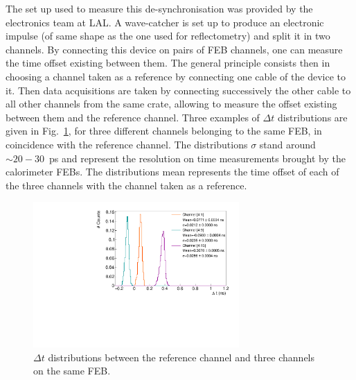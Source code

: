 The set up used to measure this de-synchronisation was provided by the electronics team at LAL.
A wave-catcher is set up to produce an electronic impulse (of same shape as the one used for reflectometry) and split it in two channels.
By connecting this device on pairs of FEB channels, one can measure the time offset existing between them.
The general principle consists then in choosing a channel taken as a reference by connecting one cable of the device to it.
Then data acquisitions are taken by connecting successively the other cable to all other channels from the same crate, allowing to measure the offset existing between them and the reference channel.
Three examples of $\Delta t$ distributions are given in Fig.~\ref{fig:FEB_offset}, for three different channels belonging to the same FEB, in coincidence with the reference channel.
The distributions $\sigma$ stand around $\sim20-30$~ps and represent the resolution on time measurements brought by the calorimeter FEBs.
The distributions mean represents the time offset of each of the three channels with the channel taken as a reference.
\begin{figure}[h!]
  \centering
  \includegraphics[width=0.7\textwidth]{commissioning/fig_commissioning/time_offset.pdf}
  \caption{$\Delta t$ distributions between the reference channel and three channels on the same FEB.
    \label{fig:FEB_offset}}
\end{figure}

